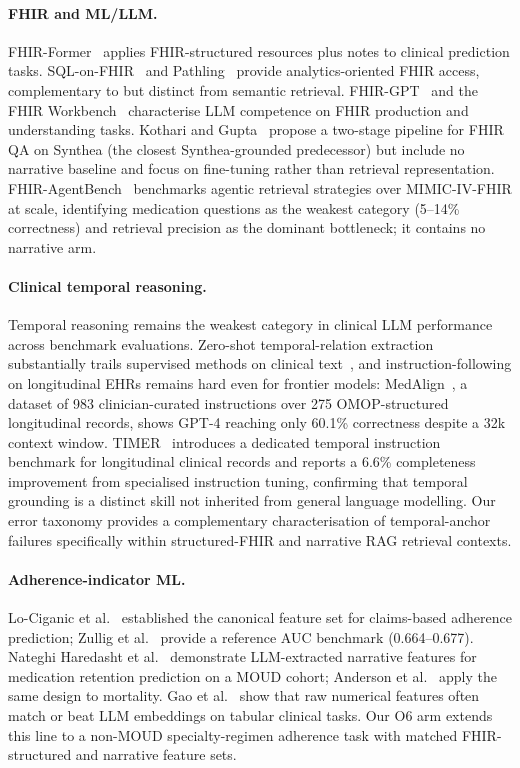 \paragraph{FHIR and ML/LLM.}
FHIR-Former~\citep{engelke2025fhirformer} applies FHIR-structured resources plus notes to
clinical prediction tasks.  SQL-on-FHIR~\citep{grimes2025sqlonfhir} and Pathling~\citep{grimes2022pathling}
provide analytics-oriented FHIR access, complementary to but distinct from semantic retrieval.
FHIR-GPT~\citep{li2024fhirgpt} and the FHIR Workbench~\citep{idrissiyaghir2025fhirworkbench}
characterise LLM competence on FHIR production and understanding tasks.
Kothari and Gupta~\citep{kothari2025patientqa} propose a two-stage pipeline for FHIR
QA on Synthea (the closest Synthea-grounded predecessor) but include no narrative baseline
and focus on fine-tuning rather than retrieval representation.
FHIR-AgentBench~\citep{lee2025fhiragentbench} benchmarks agentic retrieval strategies over
MIMIC-IV-FHIR at scale, identifying medication questions as the weakest category
(5--14\% correctness) and retrieval precision as the dominant bottleneck; it contains no
narrative arm.

\paragraph{Clinical temporal reasoning.}
Temporal reasoning remains the weakest category in clinical LLM performance across benchmark
evaluations. Zero-shot temporal-relation extraction substantially trails supervised methods
on clinical text~\citep{yuan2023zeroshot}, and instruction-following on longitudinal EHRs
remains hard even for frontier models: MedAlign~\citep{fleming2024medalign}, a dataset of
983 clinician-curated instructions over 275 OMOP-structured longitudinal records, shows
GPT-4 reaching only 60.1\% correctness despite a 32k context window.
TIMER~\citep{cui2025timer} introduces a dedicated temporal instruction benchmark for
longitudinal clinical records and reports a 6.6\% completeness improvement from specialised
instruction tuning, confirming that temporal grounding is a distinct skill not inherited
from general language modelling.
Our error taxonomy provides a complementary characterisation of temporal-anchor failures
specifically within structured-FHIR and narrative RAG retrieval contexts.

\paragraph{Adherence-indicator ML.}
Lo-Ciganic et al.~\citep{lociganic2015using} established the canonical feature set for
claims-based adherence prediction; Zullig et al.~\citep{zullig2019novel} provide a
reference AUC benchmark (0.664--0.677).  Nateghi Haredasht et al.~\citep{nateghi2025predicting}
demonstrate LLM-extracted narrative features for medication retention prediction on a MOUD
cohort; Anderson et al.~\citep{anderson2025paging} apply the same design to mortality.
Gao et al.~\citep{gao2024raw} show that raw numerical features often match or beat LLM
embeddings on tabular clinical tasks.  Our O6 arm extends this line to a non-MOUD
specialty-regimen adherence task with matched FHIR-structured and narrative feature sets.


